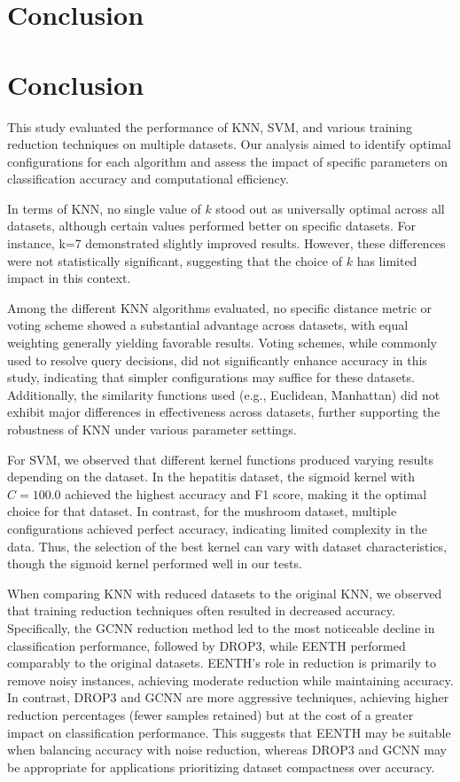 \section{Conclusion}
\section*{Conclusion}

This study evaluated the performance of KNN, SVM, and various training reduction techniques on multiple datasets. Our analysis aimed to identify optimal configurations for each algorithm and assess the impact of specific parameters on classification accuracy and computational efficiency.

In terms of KNN, no single value of $k$ stood out as universally optimal across all datasets, although certain values performed better on specific datasets. For instance, k=7 demonstrated slightly improved results. However, these differences were not statistically significant, suggesting that the choice of $k$ has limited impact in this context.

Among the different KNN algorithms evaluated, no specific distance metric or voting scheme showed a substantial advantage across datasets, with equal weighting generally yielding favorable results. Voting schemes, while commonly used to resolve query decisions, did not significantly enhance accuracy in this study, indicating that simpler configurations may suffice for these datasets. Additionally, the similarity functions used (e.g., Euclidean, Manhattan) did not exhibit major differences in effectiveness across datasets, further supporting the robustness of KNN under various parameter settings.

For SVM, we observed that different kernel functions produced varying results depending on the dataset. In the hepatitis dataset, the sigmoid kernel with $C=100.0$ achieved the highest accuracy and F1 score, making it the optimal choice for that dataset. In contrast, for the mushroom dataset, multiple configurations achieved perfect accuracy, indicating limited complexity in the data. Thus, the selection of the best kernel can vary with dataset characteristics, though the sigmoid kernel performed well in our tests.

When comparing KNN with reduced datasets to the original KNN, we observed that training reduction techniques often resulted in decreased accuracy. Specifically, the GCNN reduction method led to the most noticeable decline in classification performance, followed by DROP3, while EENTH performed comparably to the original datasets. EENTH’s role in reduction is primarily to remove noisy instances, achieving moderate reduction while maintaining accuracy. In contrast, DROP3 and GCNN are more aggressive techniques, achieving higher reduction percentages (fewer samples retained) but at the cost of a greater impact on classification performance. This suggests that EENTH may be suitable when balancing accuracy with noise reduction, whereas DROP3 and GCNN may be appropriate for applications prioritizing dataset compactness over accuracy.

